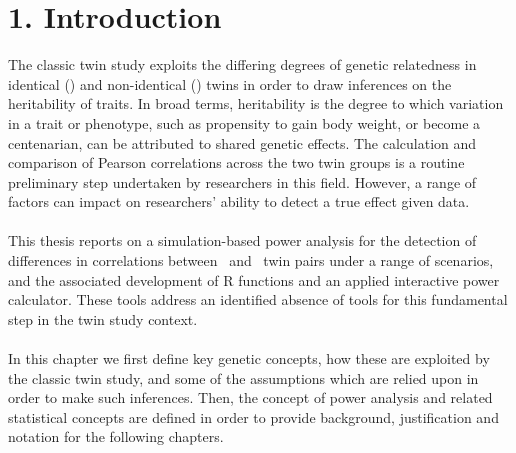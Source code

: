 \chapter*{1. Introduction}
\setcounter{chapter}{1}

			

\large



The classic twin study exploits the differing degrees of genetic relatedness in identical (\mz) and non-identical (\dz) twins in order to draw inferences on the heritability of traits.  In broad terms, heritability is the degree to which variation in a trait or phenotype, such as propensity to gain body weight, or become a centenarian, can be attributed to shared genetic effects.  The calculation and comparison of Pearson correlations across the two twin groups is a routine preliminary step undertaken by researchers in this field.  However, a range of factors can impact on researchers' ability to detect a true effect given data.  
\\
\\
This thesis reports on a simulation-based power analysis for the detection of differences in correlations between \mz \ and \dz \ twin pairs under a range of scenarios, and the associated development of R functions and an applied interactive power calculator.  These tools address an identified absence of tools for this fundamental step in the twin study context.
\\
\\
In this chapter we first define key genetic concepts, how these are exploited by the classic twin study, and some of the assumptions which are relied upon in order to make such inferences.  Then, the concept of power analysis and related statistical concepts are defined in order to provide background, justification and notation for the following chapters. 
 
